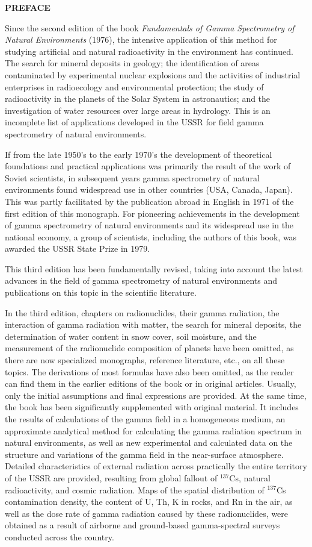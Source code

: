
%
\baselineskip=12pt
%
{\bf PREFACE}

Since the second edition of the book {\it Fundamentals of Gamma Spectrometry of Natural Environments\/} (1976), the intensive application of this method for studying artificial and natural radioactivity in the environment has continued.
The search for mineral deposits in geology; the identification of areas contaminated by experimental nuclear explosions and the activities of industrial enterprises in radioecology and environmental protection; the study of radioactivity in the planets of the Solar System in astronautics; and the investigation of water resources over large areas in hydrology.
This is an incomplete list of applications developed in the USSR for field gamma spectrometry of natural environments.

If from the late 1950's to the early 1970's the development of theoretical foundations and practical applications was primarily the result of the work of Soviet scientists, in subsequent years gamma spectrometry of natural environments found widespread use in other countries (USA, Canada, Japan).
This was partly facilitated by the publication abroad in English in 1971 of the first edition of this monograph.
For pioneering achievements in the development of gamma spectrometry of natural environments and its widespread use in the national economy, a group of scientists, including the authors of this book, was awarded the USSR State Prize in 1979.

This third edition has been fundamentally revised, taking into account the latest advances in the field of gamma spectrometry of natural environments and publications on this topic in the scientific literature.

In the third edition, chapters on radionuclides, their gamma radiation, the interaction of gamma radiation with matter, the search for mineral deposits, the determination of water content in snow cover, soil moisture, and the measurement of the radionuclide composition of planets have been omitted, as there are now specialized monographs, reference literature, etc., on all these topics.
The derivations of most formulas have also been omitted, as the reader can find them in the earlier editions of the book or in original articles.
Usually, only the initial assumptions and final expressions are provided.
At the same time, the book has been significantly supplemented with original material.
It includes the results of calculations of the gamma field in a homogeneous medium, an approximate analytical method for calculating the gamma radiation spectrum in natural environments, as well as new experimental and calculated data on the structure and variations of the gamma field in the near-surface atmosphere.
Detailed characteristics of external radiation across practically the entire territory of the USSR are provided, resulting from global fallout of $^{137}$Cs, natural radioactivity, and cosmic radiation.
Maps of the spatial distribution of $^{137}$Cs contamination density, the content of U, Th, K in rocks, and Rn in the air, as well as the dose rate of gamma radiation caused by these radionuclides, were obtained as a result of airborne and ground-based gamma-spectral surveys conducted across the country.

